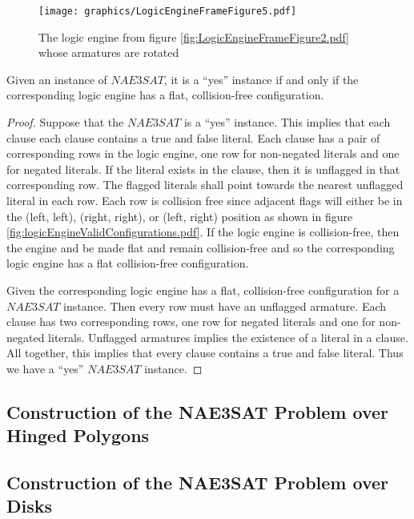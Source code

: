 \begin{figure}[!htbp]
\begin{center}
\texttt{[image: graphics/LogicEngineFrameFigure5.pdf]}
\caption{The logic engine from figure \ref{fig:LogicEngineFrameFigure2.pdf} whose armatures are rotated}\label{fig:LogicEngineFrameFigure5.pdf}
\end{center}
\end{figure}
\begin{thm}\label{thm:Satisfiability-1}
 Given an instance of $NAE3SAT$,  it is a ``yes'' instance if and only if the 
corresponding logic engine has a flat, collision-free configuration.
\end{thm}
\begin{proof}
Suppose that the $NAE3SAT$ is a ``yes'' instance.  This implies that each clause each clause contains a 
true and false literal.  Each clause has a pair of corresponding rows in the logic engine, one row for non-negated literals and one for negated literals.  If the literal exists in the clause, then it is unflagged in that corresponding row.  The flagged literals shall point towards the nearest unflagged literal in each row.  Each row is collision free since adjacent flags will either be in the (left, left), (right, right), or (left, right) position as shown in figure \ref{fig:logicEngineValidConfigurations.pdf}.  If the logic engine is collision-free, then the engine and be made flat and remain collision-free and so the corresponding logic engine has a flat collision-free configuration.

Given the corresponding logic engine has a flat, collision-free configuration for a $NAE3SAT$ instance.  Then every row must have an unflagged armature.  Each clause has two corresponding rows, one row for negated literals and one for non-negated literals.  Unflagged armatures implies the existence of a literal in a clause. All together, this implies that every clause contains a true and false literal.  Thus we have a ``yes'' $NAE3SAT$ instance.
\end{proof}

\subsection{Construction of the NAE3SAT Problem over Hinged Polygons}

\subsection{Construction of the NAE3SAT Problem over Disks}
